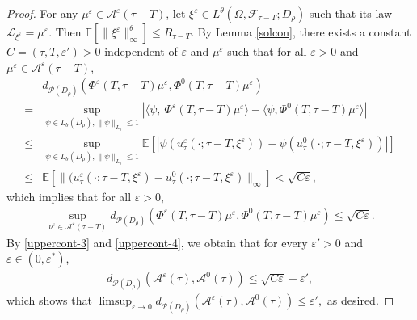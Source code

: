 \documentclass[11pt]{article}
\numberwithin{equation}{section}
\theoremstyle{plain}
\begin{document}
\begin{proof}
 For any $\mu^\varepsilon \in \mathcal{A}^\varepsilon(\tau-T)$,
 let $\xi^\varepsilon \in L^{\theta}(\Omega,\mathcal{F}_{\tau-T}; D_\rho)$ such that 
 its  law $\mathcal{L}_{\xi^\varepsilon} = \mu^\varepsilon$.
 Then
 $\mathbb{E} \left[ \| \xi^\varepsilon \|_{\infty}^{\theta} \right] \le R_{\tau-T}$.
By  Lemma \ref{solcon}, there exists a constant $C = (\tau, T, \varepsilon') > 0$ independent of 
$\varepsilon$
and $\mu^\varepsilon$ 
such that
for all $\varepsilon>0$
and
 $\mu^\varepsilon \in \mathcal{A}^\varepsilon(\tau-T)$,
 \begin{align*}
        & d_{\mathcal{P}(D_\rho)}
             \left( \Phi^\varepsilon(T, \tau-T) \mu^\varepsilon,
                    \Phi^{0}(T, \tau-T) \mu^\varepsilon
             \right) \nonumber\\
      = & \sup_{\psi \in L_b(D_\rho),\|\psi\|_{L_b} \le 1}
             \left| \langle \psi,\ \Phi^\varepsilon(T, \tau-T) \mu^\varepsilon \rangle
                    - \langle \psi,\Phi^{0}(T, \tau-T) \mu^\varepsilon \rangle
             \right| \nonumber\\
   \le & \sup_{\psi \in L_b(D_\rho),\|\psi\|_{L_b} \le 1}
           \mathbb{E}
              \left[ | \psi(u^\varepsilon_\tau(\cdot; \tau-T, \xi^\varepsilon) )
                       - \psi(u^0_\tau(\cdot; \tau-T, \xi^\varepsilon) ) |
              \right]  \nonumber\\
   \le & \mathbb{E}
              \left[ \| (u^\varepsilon_\tau(\cdot; \tau-T, \xi^\varepsilon)
                          - u^0_\tau(\cdot; \tau-T, \xi^\varepsilon)
                       \|_{\infty}
              \right] 
     < \sqrt{C \varepsilon},
 \end{align*}
 which implies that for all $\varepsilon>0$,
 \begin{align} \label{uppercont-4}
    \sup_{ \nu^\varepsilon \in \mathcal{A}^\varepsilon(\tau-T) }
       d_{\mathcal{P}(D_\rho) }
          \left( \Phi^\varepsilon(T, \tau-T) \mu^\varepsilon,
                    \Phi^{0}(T, \tau-T) \mu^\varepsilon
          \right)
    \le \sqrt{C \varepsilon}.
 \end{align}
 By \eqref{uppercont-3} and \eqref{uppercont-4},
 we obtain that for every
 $\varepsilon'>0$ and
 $\varepsilon \in (0, \varepsilon^{*})$,
 \begin{align*}
    d_{\mathcal{P}(D_\rho) }
          \left( \mathcal{A}^\varepsilon(\tau),
                 \mathcal{A}^0(\tau)
          \right)
    \le \sqrt{C \varepsilon} + \varepsilon',
 \end{align*}
which shows that
 $\limsup_{\varepsilon \to 0 }d_{ \mathcal{P}(D_\rho) }
          \left( \mathcal{A}^\varepsilon(\tau),
                 \mathcal{A}^0(\tau)
          \right)
    \le \varepsilon',
 $
as desired.
\end{proof}
\end{document}
